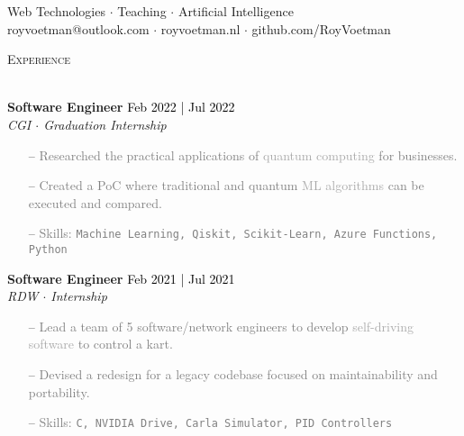 \documentclass[a4paper]{article}
\newcommand{\lineunder} {
    \vspace*{-8pt} \\
    \hspace*{-18pt} \hrulefill \\
}
\newcommand{\header} [1] {
    {\hspace*{-18pt}\vspace*{6pt} \textsc{#1}}
    \vspace*{-6pt} \lineunder
}
\newcommand{\roundpic}[4][]{
  \tikz\node [circle, minimum width = #2,
    path picture = {
      \node [#1] at (path picture bounding box.center) {
        \texttt{[image: \#4]}};
    }] {};}
\begin{document}
\vspace*{-40pt}

    

\vspace*{-10pt}

\vspace{10mm}

\begin{center}
    \centering
    \raisebox{-0.5\height}{\roundpic{2cm}{2cm}{avatar.jpg}}
    \hspace*{.1in}
    
    \vspace*{10pt}
    {Web Technologies $\cdot$ Teaching $\cdot$ Artificial Intelligence}\\
    \vspace*{3pt}
	royvoetman@outlook.com $\cdot$ royvoetman.nl $\cdot$ github.com/RoyVoetman\\
\end{center}

\vspace{5mm}

\header{Experience}
\vspace{1mm}

\textbf{Software Engineer} \hfill \textcolor{black}{Feb 2022 | Jul 2022}\\
\textit{CGI $\cdot$ Graduation Internship}\\
\vspace{-1mm}
\begin{itemize} \itemsep 1pt
    \item[--] \textcolor{gray}{Researched the practical applications of \textcolor{darkgray}{quantum computing} for businesses.}
    \item[--] \textcolor{gray}{Created a PoC where traditional and quantum \textcolor{darkgray}{ML algorithms} can be executed and compared.}
    \item[--] \textcolor{gray}{Skills: \texttt{Machine Learning, Qiskit, Scikit-Learn, Azure Functions, Python}}
\end{itemize}


\textbf{Software Engineer} \hfill \textcolor{black}{Feb 2021 | Jul 2021}\\
\textit{RDW $\cdot$ Internship}\\
\vspace{-1mm}
\begin{itemize} \itemsep 1pt
    \item[--] \textcolor{gray}{Lead a team of 5 software/network engineers to develop \textcolor{darkgray}{self-driving software} to control a kart.}
    \item[--] \textcolor{gray}{Devised a redesign for a legacy codebase focused on maintainability and portability.}
	\item[--] \textcolor{gray}{Skills: \texttt{C\scalebox{0.7}{++}, NVIDIA Drive, Carla Simulator, PID Controllers}}
\end{itemize}
\end{document}
